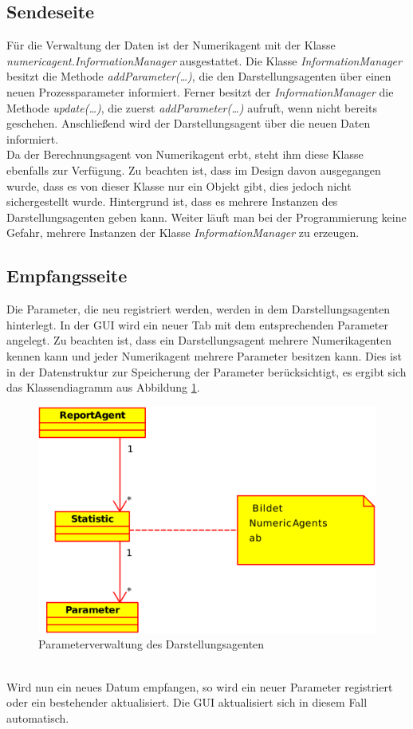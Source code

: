 \documentclass[a4paper,12pt,oneside,openright,onecolumn,final,titlepage,fleqn,ngerman]{scrreprt}
\newcommand{\parag}{\\[2ex]}
\newcommand{\calcag}{Berechnungsagent}
\newcommand{\repag}{Darstellungsagent}
\newcommand{\numag}{Numerikagent}
\begin{document}
	\subsection{Sendeseite}
	Für die Verwaltung der Daten ist der \numag{} mit der Klasse \emph{numericagent.InformationManager} ausgestattet. Die Klasse \emph{InformationManager} besitzt die Methode \emph{addParameter(\ldots)}, die den \repag{}en über einen neuen Prozessparameter informiert. Ferner besitzt der \emph{InformationManager} die Methode \emph{update(\ldots)}, die zuerst \emph{addParameter(\ldots)} aufruft, wenn nicht bereits geschehen. Anschließend wird der \repag{} über die neuen Daten informiert.\parag{}
	Da der \calcag{} von \numag{} erbt, steht ihm diese Klasse ebenfalls zur Verfügung. Zu beachten ist, dass im Design davon ausgegangen wurde, dass es von dieser Klasse nur ein Objekt gibt, dies jedoch nicht sichergestellt wurde. Hintergrund ist, dass es mehrere Instanzen des \repag{}en geben kann. Weiter läuft man bei der Programmierung keine Gefahr, mehrere Instanzen der Klasse \emph{InformationManager} zu erzeugen.

	\subsection{Empfangsseite}
	Die Parameter, die neu registriert werden, werden in dem \repag{}en hinterlegt. In der GUI wird ein neuer Tab mit dem entsprechenden Parameter angelegt. Zu beachten ist, dass ein \repag{} mehrere \numag{}en kennen kann und jeder \numag{} mehrere Parameter besitzen kann. Dies ist in der Datenstruktur zur Speicherung der Parameter berücksichtigt, es ergibt sich das Klassendiagramm aus Abbildung \ref{repag_params}.
	\begin{figure}[ht]
		\centering
		\includegraphics[keepaspectratio=true, width=\textwidth]{res/Klassendiagramm_ReportAgent_Parameterverwaltung.png}
		\caption{Parameterverwaltung des \repag{}en}
		\label{repag_params}
	\end{figure}\parag{}
	Wird nun ein neues Datum empfangen, so wird ein neuer Parameter registriert oder ein bestehender aktualisiert. Die GUI aktualisiert sich in diesem Fall automatisch.
	
\end{document}
